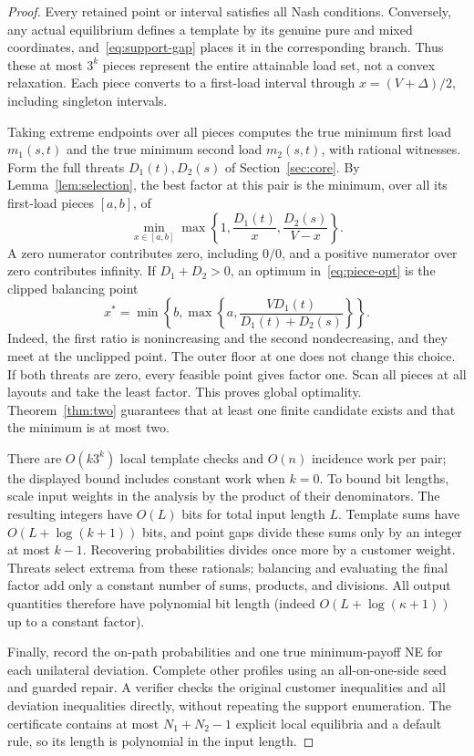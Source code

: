 \documentclass[11pt]{article}
\theoremstyle{definition}
\theoremstyle{remark}
\begin{document}
\begin{proof}
Every retained point or interval satisfies all Nash conditions. Conversely, any actual equilibrium defines a template by its genuine pure and mixed coordinates, and~\eqref{eq:support-gap} places it in the corresponding branch. Thus these at most $3^k$ pieces represent the entire attainable load set, not a convex relaxation. Each piece converts to a first-load interval through $x=(V+\Delta)/2$, including singleton intervals.

Taking extreme endpoints over all pieces computes the true minimum first load $m_1(s,t)$ and the true minimum second load $m_2(s,t)$, with rational witnesses. Form the full threats $D_1(t),D_2(s)$ of Section~\ref{sec:core}. By Lemma~\ref{lem:selection}, the best factor at this pair is the minimum, over all its first-load pieces $[a,b]$, of
\begin{equation}\label{eq:piece-opt}
 \min_{x\in[a,b]}\max\left\{1,\frac{D_1(t)}x,
                               \frac{D_2(s)}{V-x}\right\}.
\end{equation}
A zero numerator contributes zero, including $0/0$, and a positive numerator over zero contributes infinity. If $D_1+D_2>0$, an optimum in~\eqref{eq:piece-opt} is the clipped balancing point
\[
 x^*=\min\left\{b,\max\left\{a,\frac{VD_1(t)}{D_1(t)+D_2(s)}\right\}\right\}.
\]
Indeed, the first ratio is nonincreasing and the second nondecreasing, and they meet at the unclipped point. The outer floor at one does not change this choice. If both threats are zero, every feasible point gives factor one. Scan all pieces at all layouts and take the least factor. This proves global optimality. Theorem~\ref{thm:two} guarantees that at least one finite candidate exists and that the minimum is at most two.

There are $O(k3^k)$ local template checks and $O(n)$ incidence work per pair; the displayed bound includes constant work when $k=0$. To bound bit lengths, scale input weights in the analysis by the product of their denominators. The resulting integers have $O(L)$ bits for total input length $L$. Template sums have $O(L+\log(k+1))$ bits, and point gaps divide these sums only by an integer at most $k-1$. Recovering probabilities divides once more by a customer weight. Threats select extrema from these rationals; balancing and evaluating the final factor add only a constant number of sums, products, and divisions. All output quantities therefore have polynomial bit length (indeed $O(L+\log(\kappa+1))$ up to a constant factor).

Finally, record the on-path probabilities and one true minimum-payoff NE for each unilateral deviation. Complete other profiles using an all-on-one-side seed and guarded repair. A verifier checks the original customer inequalities and all deviation inequalities directly, without repeating the support enumeration. The certificate contains at most $N_1+N_2-1$ explicit local equilibria and a default rule, so its length is polynomial in the input length.
\end{proof}
\end{document}
